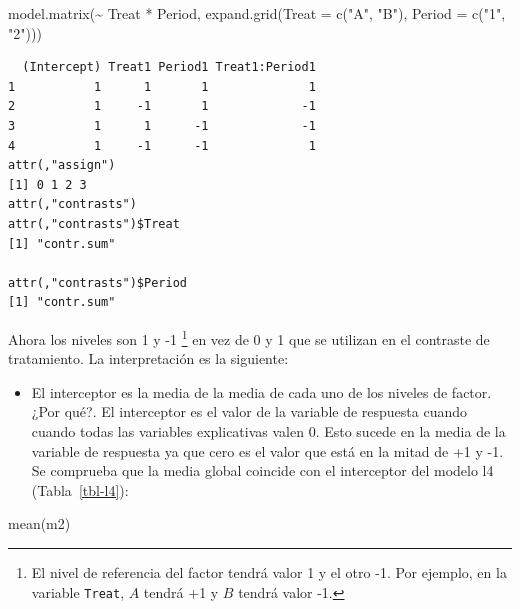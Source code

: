 \documentclass[
  12pt,
  a4paper,
  extrafontsizes,
  onecolumn,
  openright,
  table]{memoir}
\newenvironment{Shaded}{\begin{snugshade}}{\end{snugshade}}
\newcommand{\AttributeTok}[1]{\textcolor[rgb]{0.40,0.45,0.13}{#1}}
\newcommand{\FunctionTok}[1]{\textcolor[rgb]{0.28,0.35,0.67}{#1}}
\newcommand{\NormalTok}[1]{\textcolor[rgb]{0.00,0.23,0.31}{#1}}
\newcommand{\SpecialCharTok}[1]{\textcolor[rgb]{0.37,0.37,0.37}{#1}}
\newcommand{\StringTok}[1]{\textcolor[rgb]{0.13,0.47,0.30}{#1}}
\providecommand{\tightlist}{%
  \setlength{\itemsep}{0pt}\setlength{\parskip}{0pt}}\usepackage{longtable,booktabs,array}
\begin{document}
\scriptsize

\begin{Shaded}
\begin{Highlighting}[]
\FunctionTok{model.matrix}\NormalTok{(}\SpecialCharTok{\textasciitilde{}}\NormalTok{ Treat }\SpecialCharTok{*}\NormalTok{ Period, }\FunctionTok{expand.grid}\NormalTok{(}\AttributeTok{Treat =} \FunctionTok{c}\NormalTok{(}\StringTok{"A"}\NormalTok{, }\StringTok{"B"}\NormalTok{), }\AttributeTok{Period =} \FunctionTok{c}\NormalTok{(}\StringTok{"1"}\NormalTok{, }\StringTok{"2"}\NormalTok{)))}
\end{Highlighting}
\end{Shaded}

\begin{verbatim}
  (Intercept) Treat1 Period1 Treat1:Period1
1           1      1       1              1
2           1     -1       1             -1
3           1      1      -1             -1
4           1     -1      -1              1
attr(,"assign")
[1] 0 1 2 3
attr(,"contrasts")
attr(,"contrasts")$Treat
[1] "contr.sum"

attr(,"contrasts")$Period
[1] "contr.sum"
\end{verbatim}

\normalsize

Ahora los niveles son 1 y -1 \footnote{El nivel de referencia del factor
  tendrá valor 1 y el otro -1. Por ejemplo, en la variable
  \texttt{Treat}, \(A\) tendrá +1 y \(B\) tendrá valor -1.} en vez de 0
y 1 que se utilizan en el contraste de tratamiento. La interpretación es
la siguiente:

\begin{itemize}
\tightlist
\item
  El interceptor es la media de la media de cada uno de los niveles de
  factor. ¿Por qué?. El interceptor es el valor de la variable de
  respuesta cuando cuando todas las variables explicativas valen 0. Esto
  sucede en la media de la variable de respuesta ya que cero es el valor
  que está en la mitad de +1 y -1. Se comprueba que la media global
  coincide con el interceptor del modelo l4 (Tabla~\ref{tbl-l4}):
\end{itemize}

\scriptsize

\begin{Shaded}
\begin{Highlighting}[]
\FunctionTok{mean}\NormalTok{(m2)}
\end{Highlighting}
\end{Shaded}
\end{document}
